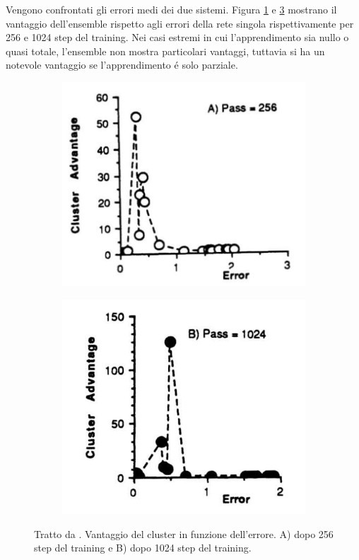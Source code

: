 \documentclass[a4paper,12pt]{report}
\begin{document}
 
 Vengono confrontati gli errori medi dei due sistemi. 
 Figura \ref{EnsembleAdvantageapng} e \ref{EnsembleAdvantagebpng} mostrano il vantaggio dell'ensemble rispetto agli errori della rete singola rispettivamente per 256 e 1024 step del training. 
 Nei casi estremi in cui l'apprendimento sia nullo o quasi totale, l'ensemble non mostra particolari vantaggi, tuttavia si ha un notevole vantaggio se l'apprendimento \'e solo parziale.
 
 \begin{figure}[h!]
  \centering
  \begin{subfigure}[b]{0.4\linewidth}
   \includegraphics[width=\linewidth]{ClusterErrora.png}
   \label{EnsembleAdvantageapng}
  \end{subfigure}
  \begin{subfigure}[b]{0.4\linewidth}
   \includegraphics[width=\linewidth]{ClusterErrorb.png}
   \label{EnsembleAdvantagebpng}
  \end{subfigure}
  \caption{Tratto da \cite{lincoln1990synergy}. Vantaggio del cluster in funzione dell'errore. A) dopo 256 step del training e B) dopo 1024 step del training.}
 \end{figure}
 
\end{document}
